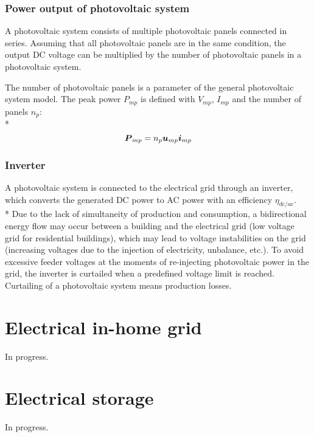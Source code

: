 \subsubsection{Power output of photovoltaic system}
A photovoltaic system consists of multiple photovoltaic panels connected in series. Assuming that all photovoltaic panels are in the same condition, the output DC voltage can be multiplied by the number of photovoltaic panels in a photovoltaic system.

The number of photovoltaic panels is a parameter of the general photovoltaic system model. The peak power $P_{mp}$ is defined with $V_{mp}$, $I_{mp}$ and the number of panels $n_p$: \\*
\begin{equation}
\boldsymbol{P}_{mp} = n_p \boldsymbol{u}_{mp} \boldsymbol{i}_{mp}
\label{Ppeak}
\end{equation}

\subsubsection{Inverter}

A photovoltaic system is connected to the electrical grid through an inverter, which converts the generated DC power to AC power with an efficiency $\eta_{dc/ac}$. \\*
%
Due to the lack of simultaneity of production and consumption, a bidirectional energy flow may occur between a building and the electrical grid (\eg low voltage grid for residential buildings), which may lead to voltage instabilities on the grid (\eg increasing voltages due to the injection of electricity, unbalance, etc.). To avoid excessive feeder voltages at the moments of re-injecting photovoltaic power in the grid, the inverter is curtailed when a predefined voltage limit is reached. Curtailing of a photovoltaic system means production losses.


\section{Electrical in-home grid}
In progress.

\section{Electrical storage}
In progress.